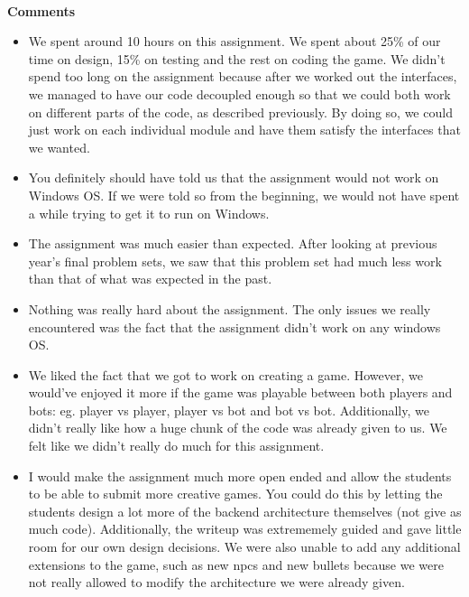 \documentclass{article}[12pt]
\begin{document}
\hspace*{\fill}\\[\baselineskip]
\Large{\textbf{Comments}}
\hspace*{\fill}
\begin{itemize}
	\item We spent around 10 hours on this assignment. We spent about 25\% of our time on design, 15\% on testing and the rest on coding the game. We didn't spend too long on the assignment because after we worked out the interfaces, we managed to have our code decoupled enough so that we could both work on different parts of the code, as described previously. By doing so, we could just work on each individual module and have them satisfy the interfaces that we wanted.
	\item You definitely should have told us that the assignment would not work on Windows OS. If we were told so from the beginning, we would not have spent a while trying to get it to run on Windows. 
	\item The assignment was much easier than expected. After looking at previous year's final problem sets, we saw that this problem set had much less work than that of what was expected in the past. 
	\item Nothing was really hard about the assignment. The only issues we really encountered was the fact that the assignment didn't work on any windows OS.
	\item We liked the fact that we got to work on creating a game. However, we would've enjoyed it more if the game was playable between both players and bots: eg. player vs player, player vs bot and bot vs bot. Additionally, we didn't really like how a huge chunk of the code was already given to us. We felt like we didn't really do much for this assignment. 
	\item I would make the assignment much more open ended and allow the students to be able to submit more creative games. You could do this by letting the students design a lot more of the backend architecture themselves (not give as much code). Additionally, the writeup was extrememely guided and gave little room for our own design decisions. We were also unable to add any additional extensions to the game, such as new npcs and new bullets because we were not really allowed to modify the architecture we were already given.
\end{itemize}
\end{document}
